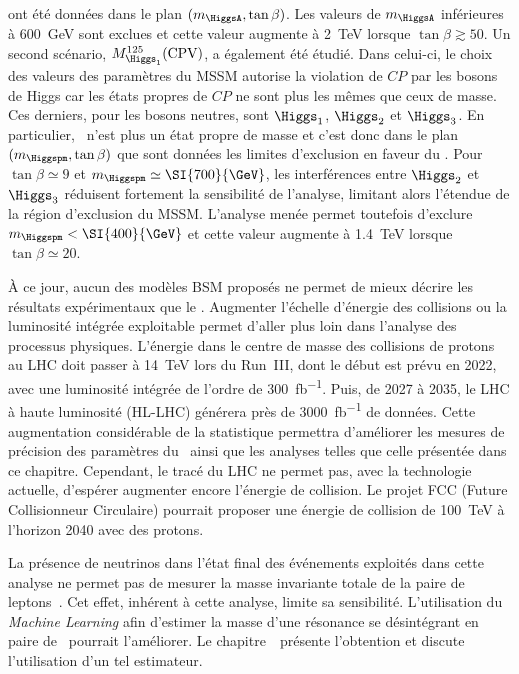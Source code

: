 ont été données
dans le plan
$(m_{\HiggsA},\tan\beta)$.
Les valeurs de $m_{\HiggsA}$ inférieures à \SI{600}{\GeV} sont exclues
et cette valeur augmente à \SI{2}{\TeV} lorsque $\tan\beta\gtrsim\num{50}$.
Un second scénario, $M_{\Higgs_1}^{125}(\text{CPV})$,
a également été étudié.
Dans celui-ci, le choix des valeurs des paramètres du MSSM
autorise la violation de $CP$ par les bosons de Higgs
car les états propres de $CP$ ne sont plus les mêmes que ceux de masse.
Ces derniers, pour les bosons neutres, sont
$\Higgs_1$, $\Higgs_2$ et $\Higgs_3$.
En particulier, \HiggsA\ n'est plus un état propre de masse et c'est donc
dans le plan $(m_{\Higgspm},\tan\beta)$ que sont données les limites d'exclusion en faveur du \SM.
Pour $\tan\beta\simeq\num{9}$ et $m_{\Higgspm}\simeq\SI{700}{\GeV}$,
les interférences entre $\Higgs_2$ et $\Higgs_3$ réduisent fortement la sensibilité de l'analyse,
limitant alors l'étendue de la région d'exclusion du MSSM.
L'analyse menée permet toutefois d'exclure $m_{\Higgspm} < \SI{400}{\GeV}$
et cette valeur augmente à \SI{1.4}{\TeV} lorsque $\tan\beta\simeq\num{20}$.
\par
À ce jour,
aucun des modèles BSM proposés ne permet de mieux décrire les résultats expérimentaux que le \SM.
Augmenter l'échelle d'énergie des collisions ou la luminosité intégrée exploitable permet d'aller plus loin dans l'analyse des processus physiques.
L'énergie dans le centre de masse des collisions de protons au LHC doit passer à \SI{14}{\TeV} lors du Run~III, dont le début est prévu en 2022, avec une luminosité intégrée de l'ordre de \SI{300}{\femto\barn^{-1}}.
Puis, de 2027 à 2035, le LHC à haute luminosité (HL-LHC) générera près de \SI{3000}{\femto\barn^{-1}} de données.
Cette augmentation considérable de la statistique
permettra d'améliorer les mesures de précision des paramètres du \SM\
ainsi que les analyses telles que celle présentée dans ce chapitre.
Cependant, le tracé du LHC ne permet pas, avec la technologie actuelle, d'espérer augmenter encore l'énergie de collision.
Le projet FCC (Future Collisionneur Circulaire) pourrait proposer une énergie de collision de \SI{100}{\TeV} à l'horizon 2040 avec des protons.
\par
La présence de neutrinos dans l'état final des événements exploités dans cette analyse
ne permet pas de mesurer la masse invariante totale de la paire de leptons~\tau.
Cet effet, inhérent à cette analyse, limite sa sensibilité.
L'utilisation du \emph{Machine Learning} afin d'estimer la masse d'une résonance se désintégrant en paire de \tau\ pourrait l'améliorer.
Le chapitre~\refChML\ présente l'obtention et discute l'utilisation d'un tel estimateur.